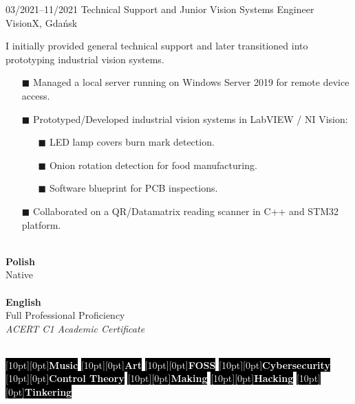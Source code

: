 \documentclass[9pt]{./packages/Developer_CV/developercv}
\begin{document}
\begin{entrylist}
    \entry
        {03/2021--11/2021}
        {Technical Support and Junior Vision Systems Engineer}
        {VisionX, Gdańsk}
        {
        I initially provided general technical support and later transitioned into prototyping industrial vision systems.
        \begin{enumerate}
            \item[$\blacksquare$] Managed a local server running on Windows Server 2019 for remote device access.
            \item[$\blacksquare$] Prototyped/Developed industrial vision systems in LabVIEW / NI Vision:
            \begin{enumerate}
                \item[$\blacksquare$] LED lamp covers burn mark detection.
                \item[$\blacksquare$] Onion rotation detection for food manufacturing.
                \item[$\blacksquare$] Software blueprint for PCB inspections.
            \end{enumerate}
            \item[$\blacksquare$] Collaborated on a QR/Datamatrix reading scanner in C++ and STM32 platform.
        \end{enumerate}
        }
    \end{entrylist}


\begin{minipage}[t]{0.5\textwidth}
    \\
    \textbf{Polish}\\Native\\ \\
    \textbf{English}\\Full Professional Proficiency \\
    \textit{ACERT C1 Academic Certificate}
\end{minipage}
\hfill
\begin{minipage}[t]{0.5\textwidth}
    \raggedright %
    \\
    \colorbox{black}{\textcolor{white}{\raisebox{0.5ex}[10pt][0pt]{\textbf{Music}}}}
    \colorbox{black}{\textcolor{white}{\raisebox{0.5ex}[10pt][0pt]{\textbf{Art}}}}
    \colorbox{black}{\textcolor{white}{\raisebox{0.5ex}[10pt][0pt]{\textbf{FOSS}}}}
    \colorbox{black}{\textcolor{white}{\raisebox{0.5ex}[10pt][0pt]{\textbf{Cybersecurity}}}}
    \colorbox{black}{\textcolor{white}{\raisebox{0.5ex}[10pt][0pt]{\textbf{Control Theory}}}}
    \colorbox{black}{\textcolor{white}{\raisebox{0.5ex}[10pt][0pt]{\textbf{Making}}}}
    \colorbox{black}{\textcolor{white}{\raisebox{0.5ex}[10pt][0pt]{\textbf{Hacking}}}}
    \colorbox{black}{\textcolor{white}{\raisebox{0.5ex}[10pt][0pt]{\textbf{Tinkering}}}}
\end{minipage}
\end{document}

